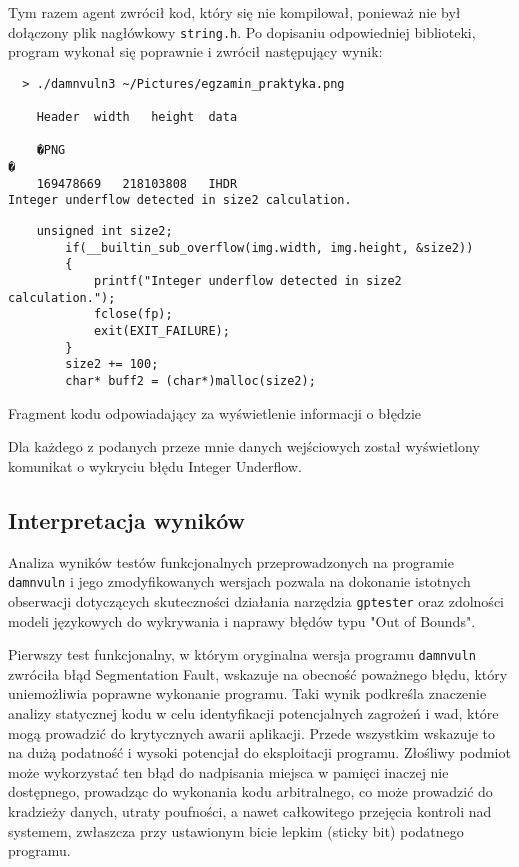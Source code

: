Tym razem agent zwrócił kod, który się nie kompilował, ponieważ nie był dołączony plik nagłówkowy \texttt{string.h}. Po dopisaniu odpowiedniej biblioteki, program wykonał się poprawnie i zwrócił następujący wynik:

\begin{verbatim}
  > ./damnvuln3 ~/Pictures/egzamin_praktyka.png 

	Header	width	height	data	

	�PNG
�
	169478669	218103808	IHDR
Integer underflow detected in size2 calculation.
\end{verbatim}

\begin{listing}
  \begin{verbatim}
    unsigned int size2;
        if(__builtin_sub_overflow(img.width, img.height, &size2))
        {
            printf("Integer underflow detected in size2 calculation.");
            fclose(fp);
            exit(EXIT_FAILURE);
        }
        size2 += 100;
        char* buff2 = (char*)malloc(size2);
\end{verbatim}
\caption{Fragment kodu odpowiadający za wyświetlenie informacji o błędzie}
\label{lst:code4}
\end{listing}

Dla każdego z podanych przeze mnie danych wejściowych został wyświetlony komunikat o wykryciu błędu Integer Underflow.

\subsection{Interpretacja wyników}
\label{subsec:interpretacja_wynikow}

Analiza wyników testów funkcjonalnych przeprowadzonych na programie \texttt{damnvuln} i jego zmodyfikowanych wersjach pozwala na dokonanie istotnych obserwacji dotyczących skuteczności działania narzędzia \texttt{gptester} oraz zdolności modeli językowych do wykrywania i naprawy błędów typu "Out of Bounds".

Pierwszy test funkcjonalny, w którym oryginalna wersja programu \texttt{damnvuln} zwróciła błąd Segmentation Fault, wskazuje na obecność poważnego błędu, który uniemożliwia poprawne wykonanie programu. Taki wynik podkreśla znaczenie analizy statycznej kodu w celu identyfikacji potencjalnych zagrożeń i wad, które mogą prowadzić do krytycznych awarii aplikacji. Przede wszystkim wskazuje to na dużą podatność i wysoki potencjał do eksploitacji programu. Złośliwy podmiot może wykorzystać ten błąd do nadpisania miejsca w pamięci inaczej nie dostępnego, prowadząc do wykonania kodu arbitralnego, co może prowadzić do kradzieży danych, utraty poufności, a nawet całkowitego przejęcia kontroli nad systemem, zwłaszcza przy ustawionym bicie lepkim (sticky bit) podatnego programu. 

